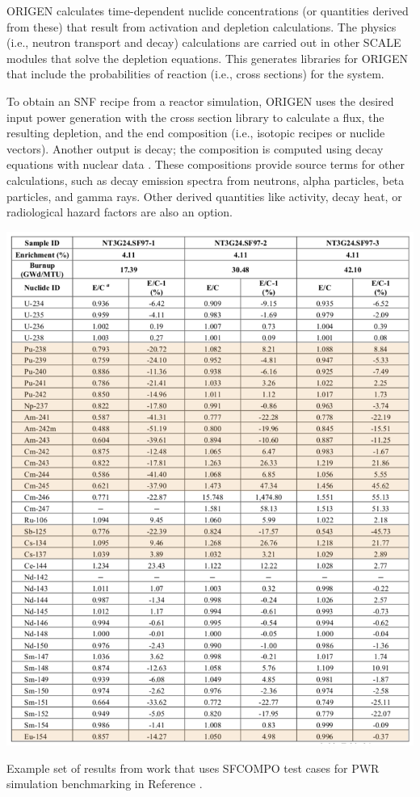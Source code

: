 \gls{ORIGEN} calculates time-dependent nuclide concentrations (or quantities
derived from these) that result from activation and depletion calculations. The
physics (i.e., neutron transport and decay) calculations are carried out in
other \gls{SCALE} modules that solve the depletion equations.  This generates
libraries for \gls{ORIGEN} that include the probabilities of reaction (i.e.,
cross sections) for the system.

To obtain an \gls{SNF} recipe from a reactor simulation, \gls{ORIGEN} uses the
desired input power generation with the cross section library to calculate a
flux, the resulting depletion, and the end composition (i.e., isotopic recipes
or nuclide vectors).  Another output is decay; the composition is computed
using decay equations with nuclear data \cite{endf}. These compositions provide
source terms for other calculations, such as decay emission spectra from
neutrons, alpha particles, beta particles, and gamma rays. Other derived
quantities like activity, decay heat, or radiological hazard factors are also
an option.

\begin{table}[!htbp]
  \centering
  \includegraphics[width=\linewidth]{./chapters/exp1/pwr_benchmark.png}
  \caption{Example set of results from work that uses \gls{SFCOMPO} test cases 
           for \gls{PWR} simulation benchmarking in Reference 
           \cite{pwr_benchmark_2010}.}
  \label{tbl:pwr_bench}
\end{table}

